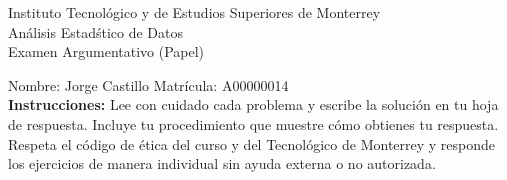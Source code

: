 \documentclass[10pt]{report}
\begin{document}
\newpage



\begin{center}
{\large Instituto Tecnol\'{o}gico y de Estudios Superiores de Monterrey \\
An\'alisis Estad\'stico de Datos } \\
Examen Argumentativo (Papel)
\end{center}

Nombre: \underline{\hspace*{.2in}}
Jorge Castillo
\underline{\hspace*{.2in}} \quad Matr\'icula:\underline{\hspace*{.2in}}
A00000014
\underline{\hspace*{.2in}} \\

{\bf Instrucciones:} Lee con cuidado cada problema y escribe la soluci\'on
en tu hoja de respuesta. Incluye tu procedimiento que muestre c\'omo obtienes tu respuesta.  Respeta el c\'odigo de \'etica del curso y del Tecnol\'ogico de Monterrey y responde los ejercicios de manera individual sin ayuda externa o no autorizada.
\end{document}
